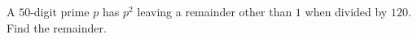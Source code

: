 A $50$-digit prime $p$ has $p^2$ leaving a remainder other than $1$ when divided by $120$. Find the remainder.
